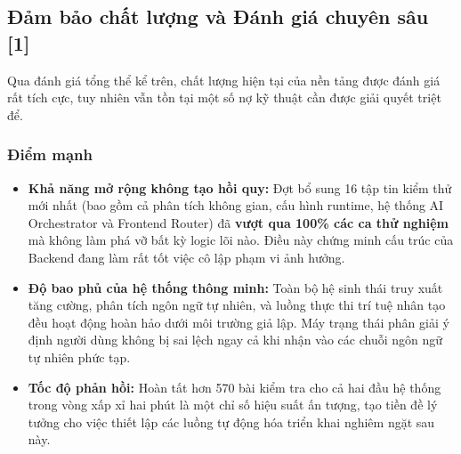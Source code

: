 \documentclass[12pt, a4paper]{article}
\begin{document}
\begin{center}
\end{center}

\subsection[Đảm bảo chất lượng và Đánh giá chuyên sâu]{Đảm bảo chất lượng và Đánh giá chuyên sâu \,{\normalfont\small\textcolor{cyan!70!black}{[1]}}}
Qua đánh giá tổng thể kể trên, chất lượng hiện tại của nền tảng được đánh giá rất tích cực, tuy nhiên vẫn tồn tại một số nợ kỹ thuật cần được giải quyết triệt để.

\subsubsection{Điểm mạnh}
\begin{itemize}
    \item \textbf{Khả năng mở rộng không tạo hồi quy:} Đợt bổ sung 16 tập tin kiểm thử mới nhất (bao gồm cả phân tích không gian, cấu hình runtime, hệ thống AI Orchestrator và Frontend Router) đã \textbf{vượt qua 100\% các ca thử nghiệm} mà không làm phá vỡ bất kỳ logic lõi nào. Điều này chứng minh cấu trúc của Backend đang làm rất tốt việc cô lập phạm vi ảnh hưởng.
    \item \textbf{Độ bao phủ của hệ thống thông minh:} Toàn bộ hệ sinh thái truy xuất tăng cường, phân tích ngôn ngữ tự nhiên, và luồng thực thi trí tuệ nhân tạo đều hoạt động hoàn hảo dưới môi trường giả lập. Máy trạng thái phân giải ý định người dùng không bị sai lệch ngay cả khi nhận vào các chuỗi ngôn ngữ tự nhiên phức tạp.
    \item \textbf{Tốc độ phản hồi:} Hoàn tất hơn 570 bài kiểm tra cho cả hai đầu hệ thống trong vòng xấp xỉ hai phút là một chỉ số hiệu suất ấn tượng, tạo tiền đề lý tưởng cho việc thiết lập các luồng tự động hóa triển khai nghiêm ngặt sau này.
\end{itemize}
\end{document}
